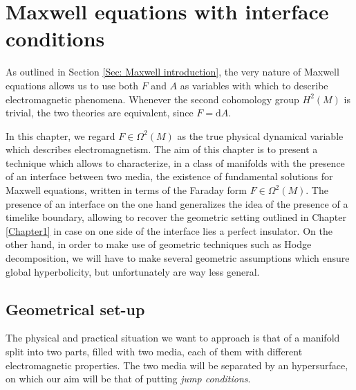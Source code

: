 \chapter{Maxwell equations with interface conditions} %

\label{Chapter2} %




As outlined in Section \ref{Sec: Maxwell introduction}, the very nature of Maxwell equations allows us to use both $F$ and $A$ as variables with which to describe electromagnetic phenomena. Whenever the second cohomology group $H^2(M)$ is trivial, the two theories are equivalent, since $F=\mathrm{d}A$.


In this chapter, we regard $F\in\Omega^2(M)$ as the true physical dynamical variable which describes electromagnetism. The aim of this chapter is to present a technique which allows to characterize, in a class of manifolds with the presence of an interface between two media, the existence of fundamental solutions for Maxwell equations, written in terms of the Faraday form $F\in\Omega^2(M)$. The presence of an interface on the one hand generalizes the idea of the presence of a timelike boundary, allowing to recover the geometric setting outlined in Chapter \ref{Chapter1} in case on one side of the interface lies a perfect insulator. On the other hand, in order to make use of geometric techniques such as Hodge decomposition, we will have to make several geometric assumptions which ensure global hyperbolicity, but unfortunately are way less general.

\section{Geometrical set-up}
The physical and practical situation we want to approach is that of a manifold split into two parts, filled with two media, each of them with different electromagnetic properties. The two media will be separated by an hypersurface, on which our aim will be that of putting \emph{jump conditions}.

